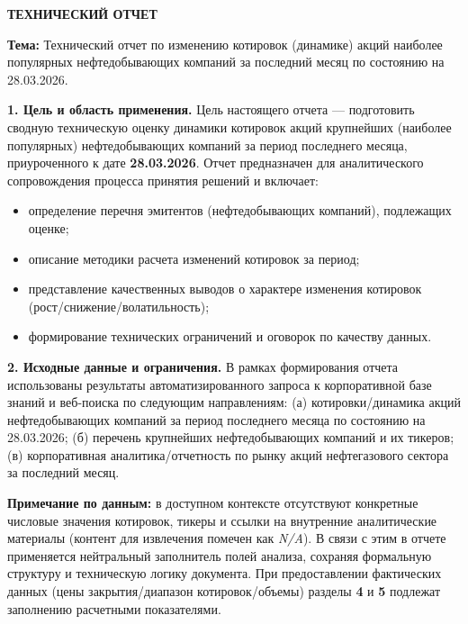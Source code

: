 \documentclass[12pt]{article}
\begin{document}
\begin{center}
\textbf{\LARGE ТЕХНИЧЕСКИЙ ОТЧЕТ}
\end{center}

\vspace{1cm}


\noindent
\textbf{Тема:} Технический отчет по изменению котировок (динамике) акций наиболее популярных нефтедобывающих компаний за последний месяц по состоянию на 28.03.2026.

\bigskip

\noindent
\textbf{1. Цель и область применения.} 
Цель настоящего отчета — подготовить сводную техническую оценку динамики котировок акций крупнейших (наиболее популярных) нефтедобывающих компаний за период последнего месяца, приуроченного к дате \textbf{28.03.2026}. Отчет предназначен для аналитического сопровождения процесса принятия решений и включает:
\begin{itemize}
    \item определение перечня эмитентов (нефтедобывающих компаний), подлежащих оценке;
    \item описание методики расчета изменений котировок за период;
    \item представление качественных выводов о характере изменения котировок (рост/снижение/волатильность);
    \item формирование технических ограничений и оговорок по качеству данных.
\end{itemize}

\bigskip

\noindent
\textbf{2. Исходные данные и ограничения.}
В рамках формирования отчета использованы результаты автоматизированного запроса к корпоративной базе знаний и веб-поиска по следующим направлениям:
(а) котировки/динамика акций нефтедобывающих компаний за период последнего месяца по состоянию на 28.03.2026; 
(б) перечень крупнейших нефтедобывающих компаний и их тикеров; 
(в) корпоративная аналитика/отчетность по рынку акций нефтегазового сектора за последний месяц.

\medskip
\noindent
\textbf{Примечание по данным:} в доступном контексте отсутствуют конкретные числовые значения котировок, тикеры и ссылки на внутренние аналитические материалы (контент для извлечения помечен как \emph{N/A}). В связи с этим в отчете применяется нейтральный заполнитель полей анализа, сохраняя формальную структуру и техническую логику документа. При предоставлении фактических данных (цены закрытия/диапазон котировок/объемы) разделы \textbf{4} и \textbf{5} подлежат заполнению расчетными показателями.
\end{document}
